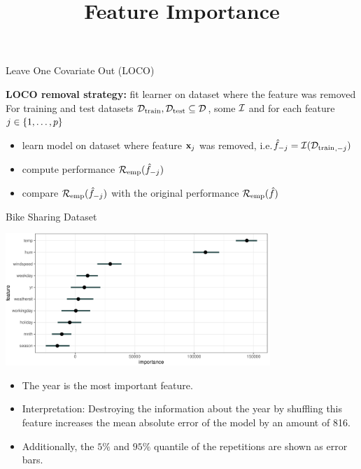 \documentclass[11pt,compress,t,notes=noshow, xcolor=table]{beamer}
\title{Feature Importance}
\institute{\href{https://compstat-lmu.github.io/lecture_i2ml/}{compstat-lmu.github.io/lecture\_i2ml}}
\date{}
\begin{document}
	
	
	
	
	
	
	
	
	
	

\begin{vbframe}{Leave One Covariate Out (LOCO)}

\textbf{LOCO removal strategy:} fit learner on dataset where the feature was removed\\
\lz
For training and test datasets $\Dtrain, \Dtest \subseteq \D$, some $\inducer$ and for each feature $j \in \pset$
  \begin{itemize}
    \item learn model on dataset where feature $\xj$ was removed, i.e.$\fh_{-j} = \inducer({\Dtrain}_{,-j})$
    \item compute performance $\riske(\fh_{-j})$
    \item compare $\riske(\fh_{-j})$ with the original performance $\riske(\fh)$
  \end{itemize}

\end{vbframe}

\begin{vbframe}{Bike Sharing Dataset}

\begin{center}
\includegraphics[width=0.75\textwidth]{figure_man/bike_sharing_loco.pdf}
\end{center}

\begin{itemize}
 \item The year is the most important feature.
 \item Interpretation: Destroying the information about the year by shuffling this feature increases the mean absolute error of the model by an amount of 816.
 \item Additionally, the $5 \%$ and $95 \%$ quantile of the repetitions are shown as error bars.
\end{itemize}
\end{vbframe}
\end{document}
